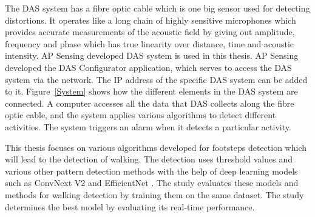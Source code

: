 The DAS system has a fibre optic cable which is one big sensor used for detecting distortions. It operates like a long chain of highly sensitive microphones which provides accurate measurements of the acoustic field by giving out amplitude, frequency and phase which has true linearity over distance, time and acoustic intensity. AP Sensing developed DAS system is used in this thesis. AP Sensing developed the DAS Configurator application, which serves to access the DAS system via the network. The IP address of the specific DAS system can be added to it. Figure~\ref{System} shows how the different elements in the DAS system are connected. A computer accesses all the data that DAS collects along the fibre optic cable, and the system applies various algorithms to detect different activities. The system triggers an alarm when it detects a particular activity.

This thesis focuses on various algorithms developed for footsteps detection which will lead to the detection of walking. The detection uses threshold values and various other pattern detection methods with the help of deep learning models such as ConvNext V2 \cite{liu2023convnextv2} and EfficientNet \cite{tan2019efficientnet}. The study evaluates these models and methods for walking detection by training them on the same dataset. The study determines the best model by evaluating its real-time performance.
